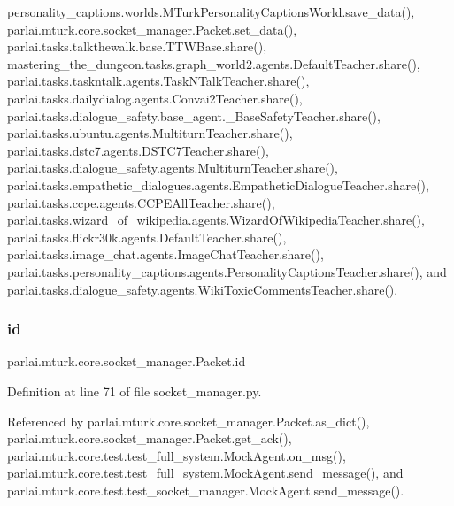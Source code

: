 personality\+\_\+captions.\+worlds.\+M\+Turk\+Personality\+Captions\+World.\+save\+\_\+data(), parlai.\+mturk.\+core.\+socket\+\_\+manager.\+Packet.\+set\+\_\+data(), parlai.\+tasks.\+talkthewalk.\+base.\+T\+T\+W\+Base.\+share(), mastering\+\_\+the\+\_\+dungeon.\+tasks.\+graph\+\_\+world2.\+agents.\+Default\+Teacher.\+share(), parlai.\+tasks.\+taskntalk.\+agents.\+Task\+N\+Talk\+Teacher.\+share(), parlai.\+tasks.\+dailydialog.\+agents.\+Convai2\+Teacher.\+share(), parlai.\+tasks.\+dialogue\+\_\+safety.\+base\+\_\+agent.\+\_\+\+Base\+Safety\+Teacher.\+share(), parlai.\+tasks.\+ubuntu.\+agents.\+Multiturn\+Teacher.\+share(), parlai.\+tasks.\+dstc7.\+agents.\+D\+S\+T\+C7\+Teacher.\+share(), parlai.\+tasks.\+dialogue\+\_\+safety.\+agents.\+Multiturn\+Teacher.\+share(), parlai.\+tasks.\+empathetic\+\_\+dialogues.\+agents.\+Empathetic\+Dialogue\+Teacher.\+share(), parlai.\+tasks.\+ccpe.\+agents.\+C\+C\+P\+E\+All\+Teacher.\+share(), parlai.\+tasks.\+wizard\+\_\+of\+\_\+wikipedia.\+agents.\+Wizard\+Of\+Wikipedia\+Teacher.\+share(), parlai.\+tasks.\+flickr30k.\+agents.\+Default\+Teacher.\+share(), parlai.\+tasks.\+image\+\_\+chat.\+agents.\+Image\+Chat\+Teacher.\+share(), parlai.\+tasks.\+personality\+\_\+captions.\+agents.\+Personality\+Captions\+Teacher.\+share(), and parlai.\+tasks.\+dialogue\+\_\+safety.\+agents.\+Wiki\+Toxic\+Comments\+Teacher.\+share().

\mbox{\label{classparlai_1_1mturk_1_1core_1_1socket__manager_1_1Packet_ad10710f49279e55b1011f585fd07bc22}} 
\subsubsection{\texorpdfstring{id}{id}}
{\footnotesize\ttfamily parlai.\+mturk.\+core.\+socket\+\_\+manager.\+Packet.\+id}



Definition at line 71 of file socket\+\_\+manager.\+py.



Referenced by parlai.\+mturk.\+core.\+socket\+\_\+manager.\+Packet.\+as\+\_\+dict(), parlai.\+mturk.\+core.\+socket\+\_\+manager.\+Packet.\+get\+\_\+ack(), parlai.\+mturk.\+core.\+test.\+test\+\_\+full\+\_\+system.\+Mock\+Agent.\+on\+\_\+msg(), parlai.\+mturk.\+core.\+test.\+test\+\_\+full\+\_\+system.\+Mock\+Agent.\+send\+\_\+message(), and parlai.\+mturk.\+core.\+test.\+test\+\_\+socket\+\_\+manager.\+Mock\+Agent.\+send\+\_\+message().

